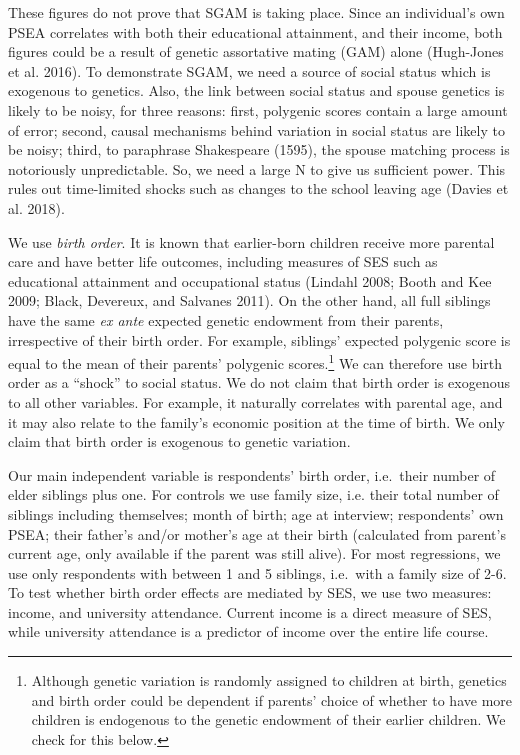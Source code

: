 \documentclass[
]{article}
\begin{document}
These figures do not prove that SGAM is taking place. Since an
individual's own PSEA correlates with both their educational attainment,
and their income, both figures could be a result of genetic assortative
mating (GAM) alone (Hugh-Jones et al. 2016). To demonstrate SGAM, we need
a source of social status which is exogenous to genetics. Also, the link
between social status and spouse genetics is likely to be noisy, for
three reasons: first, polygenic scores contain a large amount of error;
second, causal mechanisms behind variation in social status are likely
to be noisy; third, to paraphrase Shakespeare (1595), the spouse
matching process is notoriously unpredictable. So, we need a large N to
give us sufficient power. This rules out time-limited shocks such as
changes to the school leaving age (Davies et al. 2018).

We use \emph{birth order}. It is known that earlier-born children receive
more parental care and have better life outcomes, including measures of
SES such as educational attainment and occupational status
(Lindahl 2008; Booth and Kee 2009; Black, Devereux, and Salvanes 2011). On the other hand,
all full siblings have the same \emph{ex ante} expected genetic endowment
from their parents, irrespective of their birth order. For example,
siblings' expected polygenic score is equal to the mean of their
parents' polygenic scores.\footnote{Although genetic variation is randomly assigned to children at
  birth, genetics and birth order could be dependent if parents'
  choice of whether to have more children is endogenous to the genetic
  endowment of their earlier children. We check for this below.} We can therefore use birth order as a
``shock'' to social status. We do not claim that birth order is exogenous
to all other variables. For example, it naturally correlates with
parental age, and it may also relate to the family's economic position
at the time of birth. We only claim that birth order is exogenous to
genetic variation.

Our main independent variable is respondents' birth order, i.e.~their
number of elder siblings plus one. For controls we use family size, i.e.
their total number of siblings including themselves; month of birth; age
at interview; respondents' own PSEA; their father's and/or mother's age
at their birth (calculated from parent's current age, only available if
the parent was still alive). For most regressions, we use only
respondents with between 1 and 5 siblings, i.e.~with a family size of
2-6. To test whether birth order effects are mediated by SES, we use two
measures: income, and university attendance. Current income is a direct
measure of SES, while university attendance is a predictor of income
over the entire life course.
\end{document}
